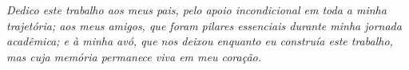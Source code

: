 \documentclass[12pt, %
openright, 
oneside, %
a4paper,    %
brazil]{facom-ufu-abntex2}
\begin{document}
\begin{dedicatoria}
   \vspace*{\fill}
   \centering
   \noindent
   \textit{Dedico este trabalho aos meus pais, pelo apoio incondicional em toda a minha trajetória; aos meus amigos, 
   que foram pilares essenciais durante minha jornada acadêmica; e à minha avó, que nos deixou enquanto eu construía este trabalho, 
   mas cuja memória permanece viva em meu coração.}  %
   \vspace*{\fill}
\end{dedicatoria}


\end{document}
